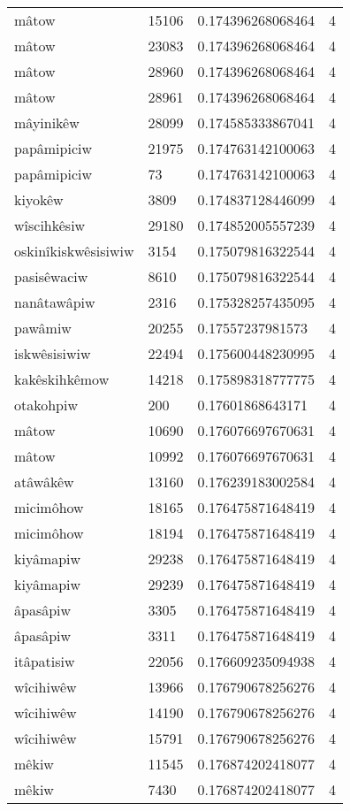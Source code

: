 \begin{longtable}{llll}
mâtow & 15106 & 0.174396268068464 & 4 \\
mâtow & 23083 & 0.174396268068464 & 4 \\
mâtow & 28960 & 0.174396268068464 & 4 \\
mâtow & 28961 & 0.174396268068464 & 4 \\
mâyinikêw & 28099 & 0.174585333867041 & 4 \\
papâmipiciw & 21975 & 0.174763142100063 & 4 \\
papâmipiciw & 73 & 0.174763142100063 & 4 \\
kiyokêw & 3809 & 0.174837128446099 & 4 \\
wîscihkêsiw & 29180 & 0.174852005557239 & 4 \\
oskinîkiskwêsisiwiw & 3154 & 0.175079816322544 & 4 \\
pasisêwaciw & 8610 & 0.175079816322544 & 4 \\
nanâtawâpiw & 2316 & 0.175328257435095 & 4 \\
pawâmiw & 20255 & 0.17557237981573 & 4 \\
iskwêsisiwiw & 22494 & 0.175600448230995 & 4 \\
kakêskihkêmow & 14218 & 0.175898318777775 & 4 \\
otakohpiw & 200 & 0.17601868643171 & 4 \\
mâtow & 10690 & 0.176076697670631 & 4 \\
mâtow & 10992 & 0.176076697670631 & 4 \\
atâwâkêw & 13160 & 0.176239183002584 & 4 \\
micimôhow & 18165 & 0.176475871648419 & 4 \\
micimôhow & 18194 & 0.176475871648419 & 4 \\
kiyâmapiw & 29238 & 0.176475871648419 & 4 \\
kiyâmapiw & 29239 & 0.176475871648419 & 4 \\
âpasâpiw & 3305 & 0.176475871648419 & 4 \\
âpasâpiw & 3311 & 0.176475871648419 & 4 \\
itâpatisiw & 22056 & 0.176609235094938 & 4 \\
wîcihiwêw & 13966 & 0.176790678256276 & 4 \\
wîcihiwêw & 14190 & 0.176790678256276 & 4 \\
wîcihiwêw & 15791 & 0.176790678256276 & 4 \\
mêkiw & 11545 & 0.176874202418077 & 4 \\
mêkiw & 7430 & 0.176874202418077 & 4 \\

\end{longtable}
